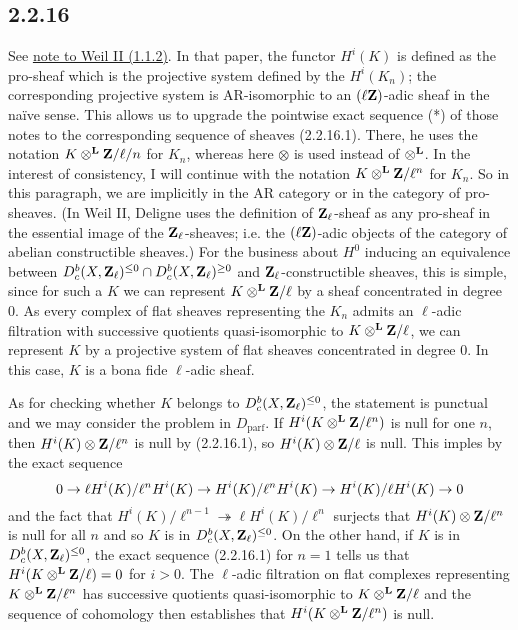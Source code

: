 \documentclass[deligne.tex]{subfiles}
\begin{document}
	\subsection*{2.2.16} See
	\hyperref[WeilII_1.1.2]{note to Weil II (1.1.2)}.
	In that paper, the functor $H^i(K)$ is defined as the pro-sheaf which is
	the projective system defined by the $H^i(K_n)$; the corresponding
	projective system is AR-isomorphic to an $(\ell\mathbf{Z})$-adic sheaf in the 
	naïve sense. This allows us to upgrade the pointwise exact sequence (*)
	of those notes to the corresponding sequence of sheaves (2.2.16.1).
	There, he uses the notation $K\otimes^{\mathbf{L}}\mathbf{Z}/\ell/n$ for $K_n$, whereas
	here $\otimes$ is used instead of $\otimes^{\mathbf{L}}$. In the interest of
	consistency, I will continue with the notation
	$K\otimes^{\mathbf{L}}\mathbf{Z}/\ell^n$ for $K_n$.
	So in this paragraph, we are implicitly in the AR category or in the
	category of pro-sheaves.
	(In Weil II, Deligne uses the definition
	of $\mathbf{Z}_\ell$-sheaf as any pro-sheaf in the essential image of the
	$\mathbf{Z}_\ell$-sheaves; i.e. the $(\ell\mathbf{Z})$-adic objects of the category
	of abelian constructible sheaves.)
	For the business about $H^0$ inducing an equivalence
	between $D_c^b(X,\mathbf{Z}_\ell)^{\leq0}\cap D_c^b(X,\mathbf{Z}_\ell)^{\geq0}$ and
	$\mathbf{Z}_\ell$-constructible sheaves, this is simple, since for such a $K$
	we can represent
	$K\otimes^{\mathbf{L}}\mathbf{Z}/\ell$ by a sheaf concentrated in degree 0.
	As every complex of flat sheaves representing the $K_n$ admits an
	$\ell$-adic filtration with successive quotients quasi-isomorphic to
	$K\otimes^{\mathbf{L}}\mathbf{Z}/\ell$, we can represent $K$ by a projective system of
	flat sheaves concentrated in degree 0. In this case, $K$ is a bona fide
	$\ell$-adic sheaf.
	
	As for checking whether $K$ belongs to $D_c^b(X,\mathbf{Z}_\ell)^{\leq0}$,
	the statement is punctual and we may consider the problem in
	$D_{\mathrm{parf}}$. If $H^i(K\otimes^{\mathbf{L}}\mathbf{Z}/\ell^n)$ is null for one $n$,
	then $H^i(K)\otimes\mathbf{Z}/\ell^n$ is null by (2.2.16.1), so
	$H^i(K)\otimes\mathbf{Z}/\ell$ is null. This imples by the exact sequence
	\begin{equation*}
		0\rightarrow\ell H^i(K)/\ell^n H^i(K)\rightarrow H^i(K)/\ell^n H^i(K)\rightarrow H^i(K)/\ell H^i(K)\rightarrow0
	\end{equation*}
	and the fact that
	$H^i(K)/\ell^{n-1}\twoheadrightarrow\ell H^i(K)/\ell^n$ surjects
	that $H^i(K)\otimes\mathbf{Z}/\ell^n$ is null for all $n$ and so $K$ is in
	$D_c^b(X,\mathbf{Z}_\ell)^{\leq0}$. On the other hand, if $K$ is in
	$D_c^b(X,\mathbf{Z}_\ell)^{\leq0}$, the exact sequence (2.2.16.1) for $n=1$
	tells us that $H^i(K\otimes^{\mathbf{L}}\mathbf{Z}/\ell)=0$ for $i>0$.
	The $\ell$-adic filtration on flat complexes 
	representing $K\otimes^{\mathbf{L}}\mathbf{Z}/\ell^n$ has successive quotients
	quasi-isomorphic to $K\otimes^{\mathbf{L}}\mathbf{Z}/\ell$ and the sequence of cohomology
	then establishes that $H^i(K\otimes^{\mathbf{L}}\mathbf{Z}/\ell^n)$ is null.
	
\end{document}
